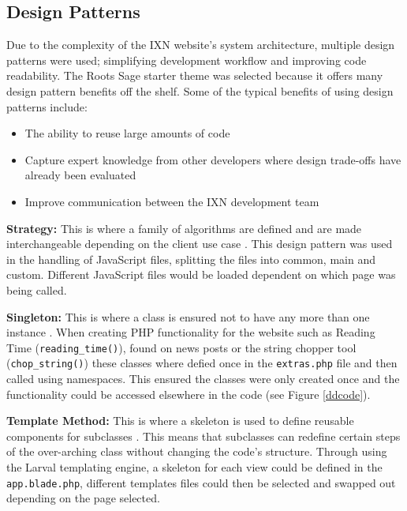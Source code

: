 \documentclass[fontsize=11pt]{extarticle}
\numberwithin{figure}{section} %
\providecommand{\tightlist}{%
  \setlength{\itemsep}{0pt}\setlength{\parskip}{0pt}}
\begin{document}
\hypertarget{design-patterns}{%
\subsection{Design Patterns}\label{design-patterns}}

Due to the complexity of the IXN website's system architecture, multiple
design patterns were used; simplifying development workflow and
improving code readability. The Roots Sage starter theme was selected
because it offers many design pattern benefits off the shelf. Some of
the typical benefits of using design patterns include:

\begin{itemize}
\tightlist
\item
  The ability to reuse large amounts of code \cite{deanDesignPatterns}
\item
  Capture expert knowledge from other developers where design trade-offs
  have already been evaluated
\item
  Improve communication between the IXN development team
\end{itemize}

\textbf{Strategy:} This is where a family of algorithms are defined and
are made interchangeable depending on the client use case
\cite{gamma1995design}. This design pattern was used in the handling of
JavaScript files, splitting the files into common, main and custom.
Different JavaScript files would be loaded dependent on which page was
being called.

\textbf{Singleton:} This is where a class is ensured not to have any
more than one instance \cite{gamma1995design}. When creating PHP
functionality for the website such as Reading Time
(\texttt{reading\_time()}), found on news posts or the string chopper
tool (\texttt{chop\_string()}) these classes where defied once in the
\texttt{extras.php} file and then called using namespaces. This ensured
the classes were only created once and the functionality could be
accessed elsewhere in the code (see Figure \ref{ddcode}).

\textbf{Template Method:} This is where a skeleton is used to define
reusable components for subclasses \cite{gamma1995design}. This means
that subclasses can redefine certain steps of the over-arching class
without changing the code's structure. Through using the Larval
templating engine, a skeleton for each view could be defined in the
\texttt{app.blade.php}, different templates files could then be selected
and swapped out depending on the page selected.
\end{document}
